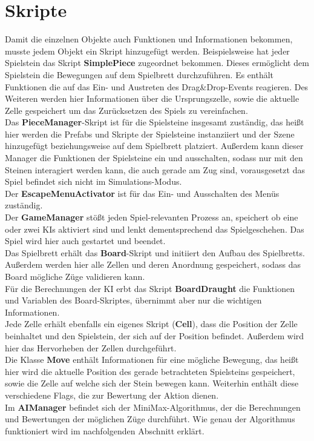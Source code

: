 \section{Skripte}
\label{ch:Implementierung:sec:Skripte}
Damit die einzelnen Objekte auch Funktionen und Informationen bekommen, musste jedem Objekt ein Skript hinzugefügt werden.
Beispielsweise hat jeder Spielstein das Skript \textbf{SimplePiece} zugeordnet bekommen. Dieses ermöglicht dem Spielstein die Bewegungen auf dem Spielbrett durchzuführen. Es enthält Funktionen die auf das Ein- und Austreten des Drag\&Drop-Events reagieren. Des Weiteren werden hier Informationen über die Ursprungszelle, sowie die aktuelle Zelle gespeichert um das Zurücksetzen des Spiels zu vereinfachen. \\
Das \textbf{PieceManager}-Skript ist für die Spielsteine insgesamt zuständig, das heißt hier werden die Prefabs und Skripte der Spielsteine instanziiert und der Szene hinzugefügt beziehungsweise auf dem Spielbrett platziert. Außerdem kann dieser Manager die Funktionen der Spielsteine ein und ausschalten, sodass nur mit den Steinen interagiert werden kann, die auch gerade am Zug sind, vorausgesetzt das Spiel befindet sich nicht im Simulations-Modus.\\
Der \textbf{EscapeMenuActivator} ist für das Ein- und Ausschalten des Menüs zuständig.\\
Der \textbf{GameManager} stößt jeden Spiel-relevanten Prozess an, speichert ob eine oder zwei KIs aktiviert sind und lenkt dementsprechend das Spielgeschehen. Das Spiel wird hier auch gestartet und beendet.\\
Das Spielbrett erhält das \textbf{Board}-Skript und initiiert den Aufbau des Spielbretts. Außerdem werden hier alle Zellen und deren Anordnung gespeichert, sodass das Board mögliche Züge validieren kann.\\
Für die Berechnungen der KI erbt das Skript \textbf{BoardDraught} die Funktionen und Variablen des Board-Skriptes, übernimmt aber nur die wichtigen Informationen.\\
Jede Zelle erhält ebenfalls ein eigenes Skript (\textbf{Cell}), dass die Position der Zelle beinhaltet und den Spielstein, der sich auf der Position befindet. Außerdem wird hier das Hervorheben der Zellen durchgeführt.\\
Die Klasse \textbf{Move} enthält Informationen für eine mögliche Bewegung, das heißt hier wird die aktuelle Position des gerade betrachteten Spielsteins gespeichert, sowie die Zelle auf welche sich der Stein bewegen kann. Weiterhin enthält diese verschiedene Flags, die zur Bewertung der Aktion dienen.\\
Im \textbf{AIManager} befindet sich der MiniMax-Algorithmus, der die Berechnungen und Bewertungen der möglichen Züge durchführt. Wie genau der Algorithmus funktioniert wird im nachfolgenden Abschnitt erklärt.

